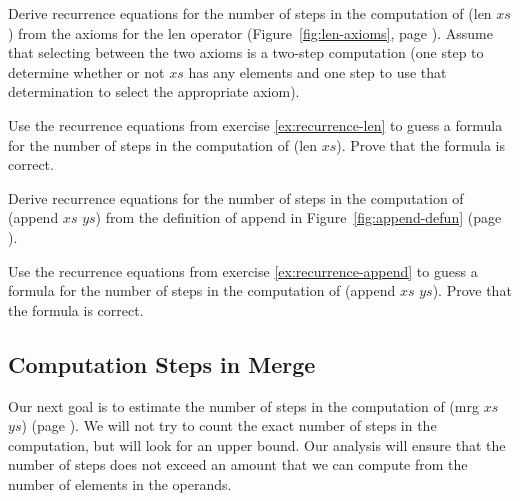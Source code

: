 \begin{ExerciseList}

\Exercise
\label{ex:recurrence-len}
Derive recurrence equations for the number of steps in the computation of (len $xs$)
from the axioms for the len operator (Figure~\ref{fig:len-axioms}, page \pageref{fig:len-axioms}).
Assume that selecting between the two axioms is a two-step computation
(one step to determine whether or not $xs$ has any elements
and one step to use that determination to select the appropriate axiom).

\Exercise
Use the recurrence equations from exercise \ref{ex:recurrence-len} to
guess a formula for the number of steps in the computation of (len $xs$).
Prove that the formula is correct.

\Exercise
\label{ex:recurrence-append}
Derive recurrence equations for the number of steps in the computation of (append $xs$ $ys$)
from the definition of append in Figure~\ref{fig:append-defun} (page \pageref{fig:append-defun}).

\Exercise
Use the recurrence equations from exercise \ref{ex:recurrence-append} to
guess a formula for the number of steps in the computation of (append $xs$ $ys$).
Prove that the formula is correct.

\end{ExerciseList}

\subsection{Computation Steps in Merge}
\label{subsec:mrg-steps}

Our next goal is to estimate the number of steps in
the computation of (mrg $xs$ $ys$) (page \pageref{defun:mrg}).
We will not try to count the exact number of steps in the computation,
but will look for an upper bound.
Our analysis will ensure that the number of steps does not exceed an
amount that we can compute from the number of elements in the operands.


